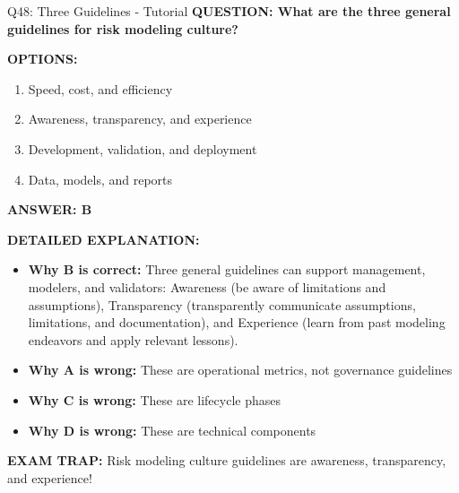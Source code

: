 \documentclass[8pt]{beamer}
\begin{document}
	\begin{frame}{Q48: Three Guidelines - Tutorial}
		\fontsize{6.5}{7.5}\selectfont
		\textbf{QUESTION: What are the three general guidelines for risk modeling culture?}
		
		\vspace{0.1cm}
		\textbf{OPTIONS:}
		\begin{enumerate}
			\item Speed, cost, and efficiency
			\item Awareness, transparency, and experience
			\item Development, validation, and deployment
			\item Data, models, and reports
		\end{enumerate}
		
		\vspace{0.1cm}
		\textcolor{myblue}{\textbf{ANSWER: B}}
		
		\vspace{0.1cm}
		\textbf{DETAILED EXPLANATION:}
		\begin{itemize}
			\item \textbf{Why B is correct:} Three general guidelines can support management, modelers, and validators: Awareness (be aware of limitations and assumptions), Transparency (transparently communicate assumptions, limitations, and documentation), and Experience (learn from past modeling endeavors and apply relevant lessons).
			\item \textbf{Why A is wrong:} These are operational metrics, not governance guidelines
			\item \textbf{Why C is wrong:} These are lifecycle phases
			\item \textbf{Why D is wrong:} These are technical components
		\end{itemize}
		
		\textcolor{myred}{\textbf{EXAM TRAP:}} Risk modeling culture guidelines are \textcolor{myblue}{awareness, transparency, and experience}!
	\end{frame}
	
\end{document}
